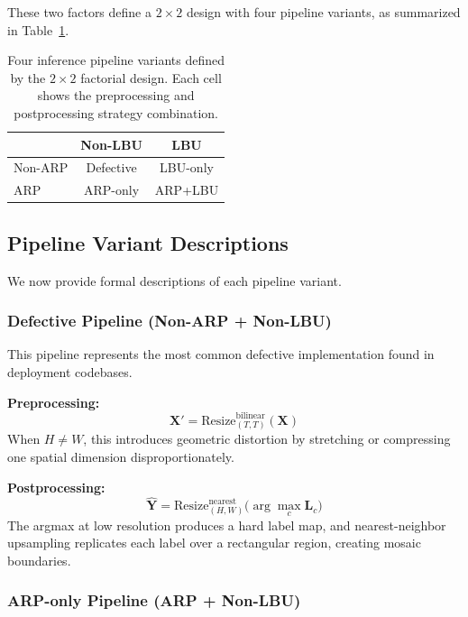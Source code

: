 \documentclass[10pt,twocolumn]{article}
\begin{document}
These two factors define a $2\times2$ design with four pipeline variants, as summarized in Table~\ref{tab:pipeline_variants}.

\begin{table}[t]
\centering
\caption{Four inference pipeline variants defined by the $2\times2$ factorial design. Each cell shows the preprocessing and postprocessing strategy combination.}
\label{tab:pipeline_variants}
\begin{tabular}{lcc}
\toprule
 & Non-LBU & LBU \\
\midrule
Non-ARP & Defective & LBU-only \\
ARP     & ARP-only  & ARP+LBU \\
\bottomrule
\end{tabular}
\end{table}

\subsection{Pipeline Variant Descriptions}
\label{sec:pipelines}

We now provide formal descriptions of each pipeline variant.

\subsubsection{Defective Pipeline (Non-ARP + Non-LBU)}

This pipeline represents the most common defective implementation found in deployment codebases.

\textbf{Preprocessing:}
\begin{equation}
    \mathbf{X}' = \text{Resize}_{(T,T)}^{\text{bilinear}}(\mathbf{X})
\end{equation}
When $H \neq W$, this introduces geometric distortion by stretching or compressing one spatial dimension disproportionately.

\textbf{Postprocessing:}
\begin{equation}
    \hat{\mathbf{Y}} = \text{Resize}_{(H,W)}^{\text{nearest}}\Big(\arg\max_c \mathbf{L}_c\Big)
\end{equation}
The argmax at low resolution produces a hard label map, and nearest-neighbor upsampling replicates each label over a rectangular region, creating mosaic boundaries.

\subsubsection{ARP-only Pipeline (ARP + Non-LBU)}
\end{document}
